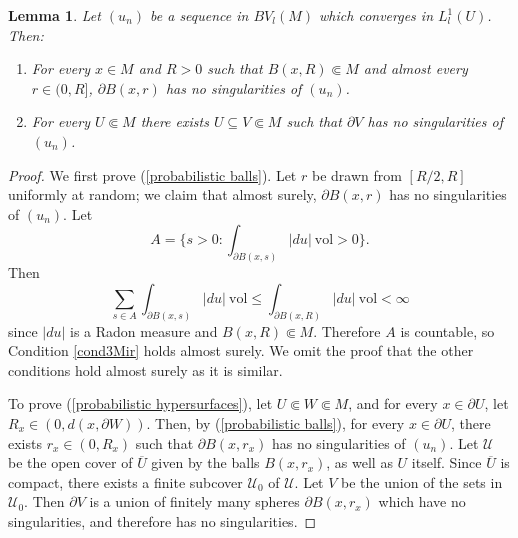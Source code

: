 \documentclass[reqno,12pt,letterpaper]{amsart}
\newcommand{\NN}{\mathbf{N}}
\newcommand{\vol}{\mathrm{vol}}
\newtheorem{lemma}[theorem]{Lemma}
\theoremstyle{definition}
\numberwithin{equation}{section}
\begin{document}
\begin{lemma}\label{probabilistic method}
Let $(u_n)$ be a sequence in $BV_l(M)$ which converges in $L^1_l(U)$. Then:
\begin{enumerate}
\item \label{probabilistic balls} For every $x \in M$ and $R > 0$ such that $B(x, R) \Subset M$ and almost every $r \in (0, R]$, $\partial B(x, r)$ has no singularities of $(u_n)$.
\item \label{probabilistic hypersurfaces} For every $U \Subset M$ there exists $U \subseteq V \Subset M$ such that $\partial V$ has no singularities of $(u_n)$.
\end{enumerate}
\end{lemma}
\begin{proof}
We first prove (\ref{probabilistic balls}).
Let $r$ be drawn from $[R/2, R]$ uniformly at random; we claim that almost surely, $\partial B(x, r)$ has no singularities of $(u_n)$.
Let
$$A = \{s > 0: \int_{\partial B(x, s)} |du| ~\vol > 0\}.$$
Then
$$\sum_{s \in A} \int_{\partial B(x, s)} |du| ~\vol \leq \int_{\partial B(x, R)} |du| ~\vol < \infty$$
since $|du|$ is a Radon measure and $B(x, R) \Subset M$.
Therefore $A$ is countable,
so Condition \ref{cond3Mir} holds almost surely.
We omit the proof that the other conditions hold almost surely as it is similar.

To prove (\ref{probabilistic hypersurfaces}), let $U \Subset W \Subset M$, and for every $x \in \partial U$, let $R_x \in (0, d(x, \partial W))$.
Then, by (\ref{probabilistic balls}), for every $x \in \partial U$, there exists $r_x \in (0, R_x)$ such that $\partial B(x, r_x)$ has no singularities of $(u_n)$.
Let $\mathcal U$ be the open cover of $\overline U$ given by the balls $B(x, r_x)$, as well as $U$ itself.
Since $\overline U$ is compact, there exists a finite subcover $\mathcal U_0$ of $\mathcal U$.
Let $V$ be the union of the sets in $\mathcal U_0$.
Then $\partial V$ is a union of finitely many spheres $\partial B(x, r_x)$ which have no singularities, and therefore has no singularities.
\end{proof}
\end{document}
